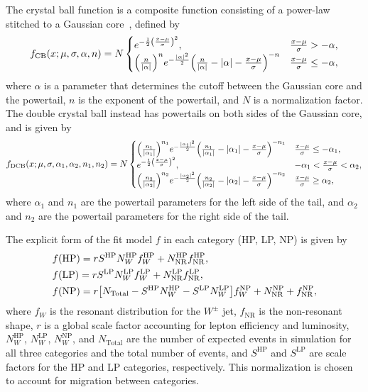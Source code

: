 The crystal ball function is a composite function consisting of a power-law stitched to a Gaussian core~\cite{Cheng_2016}, defined by
\begin{equation}
  f_\mathrm{CB}(x;\mu,\sigma,\alpha,n)=N
  \begin{cases}
    e^{-\frac{1}{2}\pqty{\frac{x-\mu}{\sigma}}^2}, & \frac{x-\mu}{\sigma}>-\alpha,\\
    \pqty{\frac{n}{|\alpha|}}^ne^{-\frac{|\alpha|^2}{2}}\pqty{\frac{n}{|\alpha|}-|\alpha|-\frac{x-\mu}{\sigma}}^{-n} & \frac{x-\mu}{\sigma}\leq-\alpha,
  \end{cases}
\end{equation}
where $\alpha$ is a parameter that determines the cutoff between the Gaussian core and the powertail, $n$ is the exponent of the powertail, and $N$ is a normalization factor.
The double crystal ball instead has powertails on both sides of the Gaussian core, and is given by
\begin{equation}
  f_\mathrm{DCB}(x;\mu,\sigma,\alpha_1,\alpha_2,n_1,n_2)=N
  \begin{cases}
    \pqty{\frac{n_1}{|\alpha_1|}}^{n_1}e^{-\frac{|\alpha_1|^2}{2}}\pqty{\frac{n_1}{|\alpha_1|}-|\alpha_1|-\frac{x-\mu}{\sigma}}^{-n_1} & \frac{x-\mu}{\sigma}\leq-\alpha_1,\\
    e^{-\frac{1}{2}\pqty{\frac{x-\mu}{\sigma}}^2}, & -\alpha_1<\frac{x-\mu}{\sigma}<\alpha_2,\\
    \pqty{\frac{n_2}{|\alpha_2|}}^{n_2}e^{-\frac{|\alpha_2|^2}{2}}\pqty{\frac{n_2}{|\alpha_2|}-|\alpha_2|-\frac{x-\mu}{\sigma}}^{-n_2} & \frac{x-\mu}{\sigma}\geq\alpha_2,
  \end{cases}
\end{equation}
where $\alpha_1$ and $n_1$ are the powertail parameters for the left side of the tail, and $\alpha_2$ and $n_2$ are the powertail parameters for the right side of the tail.

The explicit form of the fit model $f$ in each category (HP, LP, NP) is given by
\begin{align}
  & f(\mathrm{HP})=rS^\mathrm{HP}N_W^\mathrm{HP}f_W^\mathrm{HP}+N_\mathrm{NR}^\mathrm{HP}f_\mathrm{NR}^\mathrm{HP},\label{eq:VtagFit1}\\
  & f(\mathrm{LP})=rS^\mathrm{LP}N_W^\mathrm{LP}f_W^\mathrm{LP}+N_\mathrm{NR}^\mathrm{LP}f_\mathrm{NR}^\mathrm{LP},\label{eq:VtagFit2}\\
  & f(\mathrm{NP})=r\bqty{N_\mathrm{Total}-S^\mathrm{HP}N_W^\mathrm{HP}-S^\mathrm{LP}N_W^\mathrm{LP}}f_W^\mathrm{NP}+N_\mathrm{NR}^\mathrm{NP}+f_\mathrm{NR}^\mathrm{NP},\label{eq:VtagFit3}
\end{align}
where $f_W$ is the resonant distribution for the $W^\pm$ jet, $f_\mathrm{NR}$ is the non-resonant shape, $r$ is a global scale factor accounting for lepton efficiency and luminosity, $N_{W}^\mathrm{HP}$, $N_{W}^\mathrm{LP}$, $N_{W}^\mathrm{NP}$, and $N_\mathrm{Total}$ are the number of expected events in simulation for all three categories and the total number of events, and $S^\mathrm{HP}$ and $S^\mathrm{LP}$ are scale factors for the HP and LP categories, respectively.
This normalization is chosen to account for migration between categories.

